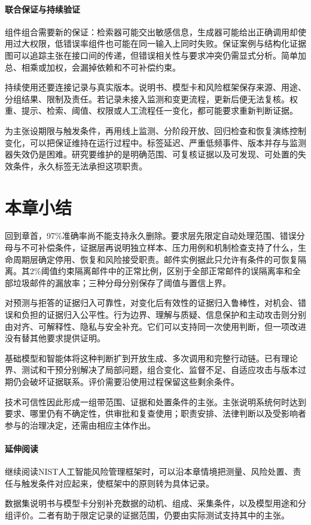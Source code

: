 \paragraph{联合保证与持续验证}

组件组合需要新的保证：检索器可能交出敏感信息，生成器可能给出正确调用却使用过大权限，低错误率组件也可能在同一输入上同时失败。保证案例与结构化证据图可以追踪主张在接口间的传递，但错误相关性与要求冲突仍需显式分析。简单加总、相乘或加权，会漏掉依赖和不可补偿约束。

持续使用还要连接记录与真实版本。说明书、模型卡和风险框架保存来源、用途、分组结果、限制及责任。若记录未接入监测和变更流程，更新后便无法复核。权重、提示、检索、阈值、权限或人工流程任一变化，都可能要求重新判断证据。

为主张设期限与触发条件，再用线上监测、分阶段开放、回归检查和恢复演练控制变化，可以把保证维持在运行过程中。标签延迟、严重低频事件、版本并存与监测器失效仍是困难。研究要维护的是明确范围、可复核证据以及可发现、可处置的失效条件，永久标签无法承担这项职责。

\section{本章小结}
\label{sec:trust-foundations-summary}

回到章首，97\%准确率尚不能支持永久删除。要求层先限定自动处理范围、错误分母与不可补偿条件，证据层再说明独立样本、压力用例和机制检查支持了什么，生命周期层确定停用、恢复和风险接受职责。邮件实例据此只允许有条件的可恢复隔离。其2\%阈值约束隔离邮件中的正常比例，区别于全部正常邮件的误隔离率和全部垃圾邮件的漏放率；三种分母分别保存了阈值与置信上界。

对预测与拒答的证据归入可靠性，对变化后有效性的证据归入鲁棒性，对机会、错误和负担的证据归入公平性。行为边界、理解与质疑、信息保护和主动攻击则分别由对齐、可解释性、隐私与安全补充。它们可以支持同一次使用判断，但一项改进没有替其他要求提供证明。

基础模型和智能体将这种判断扩到开放生成、多次调用和完整行动链。已有理论界、测试和干预分别解决了局部问题，组合变化、监督不足、自适应攻击与版本过期仍会破坏证据联系。评价需要沿使用过程保留这些剩余条件。

技术可信性因此形成一组带范围、证据和处置条件的主张。主张说明系统何时达到要求、哪里仍有不确定性，供审批和复查使用；职责安排、法律判断以及受影响者参与的治理决定，还需由相应主体作出。

\paragraph{延伸阅读}

继续阅读NIST人工智能风险管理框架时，可以沿本章情境把测量、风险处置、责任与触发条件对应起来，使框架中的原则转为具体记录。

数据集说明书与模型卡分别补充数据的动机、组成、采集条件，以及模型用途和分组评价。二者有助于限定记录的证据范围，仍要由实际测试支持其中的主张。
